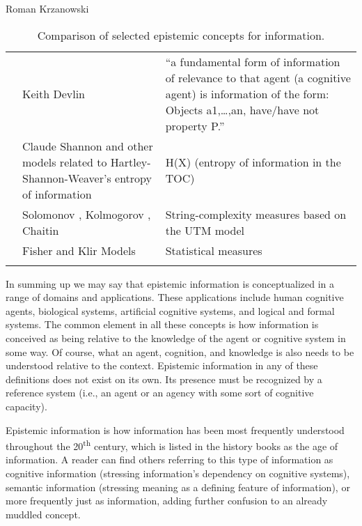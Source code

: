 \begin{artengenv}{Roman Krzanowski}
\begin{small}
\begin{longtable}{p{}p{}p{}}
&
Keith Devlin
\parencite*[][]{devlin_logic_1991}%
 &
``a fundamental form of information of relevance to that agent (a cognitive agent) is information of the form: Objects a1,…,an, have/have not property P.''\\
&
Claude Shannon
\parencite*[][]{shannon_mathematical_1948} %
 and other models related to Hartley-Shannon-Weaver's entropy of information &
H(X) (entropy of information in the TOC)\\
&
Solomonov \parencite*[][]{solomonoff_algorithmic_2010},
Kolmogorov \parencite*[][]{kolmogorov_1965}, %
 Chaitin \parencite*{chaitin_algorithmic_1987} &
String-complexity measures based on the UTM model\\
&
Fisher and Klir
\parencite*[][]{klir_fuzzy_1988} %
 Models &
Statistical measures\\
\caption{Comparison of selected epistemic concepts for information.}\label{tab2-krza}
\end{longtable}
\end{small}

In summing up we may say that epistemic information is conceptualized in a range of domains and applications. These applications include human cognitive agents, biological systems, artificial cognitive systems, and logical and formal systems. The common element in all these concepts is how information is conceived as being relative to the knowledge of the agent or cognitive system in some way. Of course, what an agent, cognition, and knowledge is also needs to be understood relative to the context. Epistemic information in any of these definitions does not exist on its own. Its presence must be recognized by a reference system (i.e., an agent or an agency with some sort of cognitive capacity).

Epistemic information is how information has been most frequently understood throughout the 20\textsuperscript{th} century, which is listed in the history books as the age of information. A reader can find others referring to this type of information as cognitive information (stressing information's dependency on cognitive systems), semantic information (stressing meaning as a defining feature of information), or more frequently just as information, adding further confusion to an already muddled concept.


\end{artengenv}
